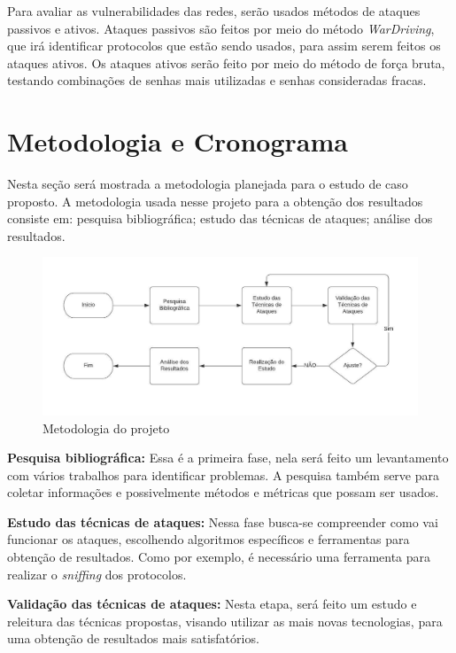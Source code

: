 \documentclass[
	article,			%
	11pt,				%
	oneside,			%
	a4paper,			%
	english,			%
	brazil,				%
	sumario=tradicional
	]{abntex2}
\begin{document}
Para avaliar as vulnerabilidades das redes, serão usados métodos de ataques passivos e ativos. Ataques passivos são feitos por meio do método \textit{WarDriving}, que irá identificar protocolos que estão sendo usados, para assim serem feitos os ataques ativos. Os ataques ativos serão feito por meio do método de força bruta, testando combinações de senhas mais utilizadas e senhas consideradas fracas.
    
\section{Metodologia e Cronograma}
Nesta seção será mostrada a metodologia planejada para o estudo de caso proposto. A metodologia usada nesse projeto para a obtenção dos resultados consiste em: pesquisa bibliográfica; estudo das técnicas de ataques; análise dos resultados.

\begin{figure} [!hbt] 
	\centering
	\label{figura1}
	\includegraphics[width=1.0\textwidth]{fluxogramaD.jpeg}
	\caption{Metodologia do projeto}
\end{figure}

\textbf{Pesquisa bibliográfica:}
Essa é a primeira fase, nela será feito um levantamento com vários trabalhos para identificar problemas. A pesquisa também serve para coletar informações e possivelmente métodos e métricas que possam ser usados.

\textbf{Estudo das técnicas de ataques:}
Nessa fase busca-se compreender como vai funcionar 
os ataques, escolhendo algoritmos específicos e ferramentas para obtenção de resultados. Como por exemplo, é necessário uma ferramenta para realizar o \textit{sniffing} dos protocolos.

\textbf{Validação das técnicas de ataques:}
Nesta etapa, será feito um estudo e releitura das técnicas propostas, visando utilizar as mais novas tecnologias, para uma obtenção de resultados
mais satisfatórios.  
\end{document}
